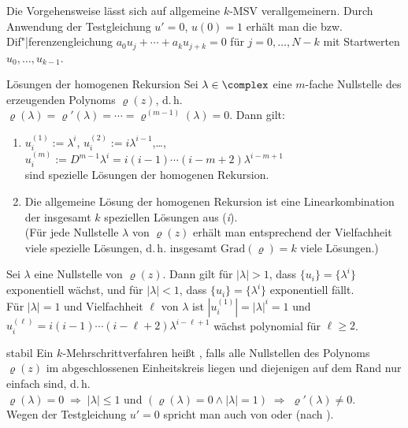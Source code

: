 \linie

\begin{Bem}
    Die Vorgehensweise lässt sich auf allgemeine $k$-MSV verallgemeinern.
    Durch Anwendung der Testgleichung $u' = 0$, $u(0) = 1$ erhält man die
     bzw. Dif"|ferenzengleichung
    $a_0 u_j + \dotsb + a_k u_{j+k} = 0$ für $j = 0, \dotsc, N - k$
    mit Startwerten $u_0, \dotsc, u_{k-1}$.
\end{Bem}

\begin{Satz}{Lösungen der homogenen Rekursion}
    Sei $\lambda \in \complex$ eine $m$-fache Nullstelle des erzeugenden
    Polynoms $\varrho(z)$, d.\,h.
    $\varrho(\lambda) = \varrho'(\lambda) = \dotsb =
    \varrho^{(m-1)}(\lambda) = 0$.
    Dann gilt:
    \begin{enumerate}[label=(\emph{\roman*})]
        \item
        $u_i^{(1)} := \lambda^i$,\qquad
        $u_i^{(2)} := i \lambda^{i-1}$,\qquad \dots,\qquad
        $u_i^{(m)} := D^{m-1} \lambda^i =
        i (i - 1) \dotsm (i - m + 2) \lambda^{i-m+1}$\\
        sind spezielle Lösungen der homogenen Rekursion.
        
        \item
        Die allgemeine Lösung der homogenen Rekursion ist eine
        Linearkombination der insgesamt $k$ speziellen Lösungen aus
        (\emph{i}).\\
        (Für jede Nullstelle $\lambda$ von $\varrho(z)$ erhält man entsprechend
        der Vielfachheit viele spezielle Lösungen, d.\,h. insgesamt
        $\text{Grad}(\varrho) = k$ viele Lösungen.)
    \end{enumerate}
\end{Satz}

\begin{Bem}
    Sei $\lambda$ eine Nullstelle von $\varrho(z)$.
    Dann gilt für $|\lambda| > 1$, dass $\{u_i\} = \{\lambda^i\}$ exponentiell
    wächst, und für $|\lambda| < 1$, dass $\{u_i\} = \{\lambda^i\}$
    exponentiell fällt.\\
    Für $|\lambda| = 1$ und Vielfachheit $\ell$ von $\lambda$ ist
    $|u_i^{(1)}| = |\lambda|^i = 1$ und
    $u_i^{(\ell)} = i (i - 1) \dotsm (i - \ell + 2) \lambda^{i - \ell + 1}$
    wächst polynomial für $\ell \ge 2$.
\end{Bem}

\linie
\pagebreak

\begin{Def}{stabil}
    Ein $k$-Mehrschrittverfahren heißt , falls alle Nullstellen
    des Polynoms $\varrho(z)$ im abgeschlossenen Einheitskreis liegen und
    diejenigen auf dem Rand nur einfach sind, d.\,h.\\
    $\varrho(\lambda) = 0 \;\Rightarrow\; |\lambda| \le 1$ und
    $(\varrho(\lambda) = 0 \land |\lambda| = 1) \;\Rightarrow\;
    \varrho'(\lambda) \not= 0$.\\
    Wegen der Testgleichung $u' = 0$ spricht man auch von
     oder 
    (nach ).
\end{Def}

